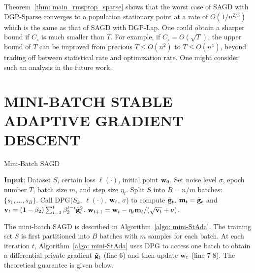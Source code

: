 \documentclass[11pt]{article}
\begin{document}
Theorem~\ref{thm: main_rmsprop_sparse} shows that the worst case of SAGD with DGP-Sparse converges to a population stationary point at a rate of $O(1/n^{2/3})$ which is the same as that of SAGD with DGP-Lap. One could obtain a sharper bound if $C_{s}$ is much smaller than $T$. For example, if $C_{s} = O(\sqrt{T})$, the upper bound of $T$ can be improved from precious $T \leq O(n^2)$ to $T \leq O(n^4)$, beyond trading off between statistical rate and optimization rate. One might consider such an analysis in the future work.



\section{MINI-BATCH STABLE ADAPTIVE GRADIENT DESCENT}
\label{mini-batch algorithm}
\begin{algorithm}[h] 
\caption{Mini-Batch SAGD}
\begin{algorithmic}[1] \label{algo: mini-StAda}
\STATE \textbf{Input}: Dataset $S$,  certain loss $\ell(\cdot)$, initial point $\mathbf{w}_0$.
\STATE Set noise level $\sigma$, epoch number $T$,  batch size $m$, and step size $\eta_t$.
\STATE Split $S$ into $B=n/m$ batches: $\{ s_1,..., s_B\}$.
\STATE Call DPG($S_k$,  $\ell(\cdot)$, $\mathbf{w}_t$, $\sigma$) to compute $\tilde {\mathbf{g}}_t$.
\STATE $\mathbf{m}_t = \tilde {\mathbf{g}}_t$ and $\mathbf{v}_t = \left(1-\beta_{2}\right) \sum_{i=1}^{t} \beta_{2}^{t-i} \tilde {\mathbf{g}}_{i}^{2}$.
\STATE $\mathbf{w}_{t+1}=\mathbf{w}_{t}-\eta_t \mathbf{m}_t /(\sqrt{\mathbf{v}_t}+\nu)$.
\ENDFOR
\ENDFOR 
\end{algorithmic}
\end{algorithm} 

The mini-batch SAGD is described in
Algorithm~\ref{algo: mini-StAda}. The training set $S$ is first partitioned
into $B$ batches with $m$ samples for each batch. At each iteration $t$, Algorithm~\ref{algo: mini-StAda} uses DPG to access one batch to obtain a differential private gradient $\tilde {\mathbf{g}}_t$ (line 6) and then update $\mathbf{w}_t$ (line 7-8). %
The theoretical guarantee is given below.
\end{document}
